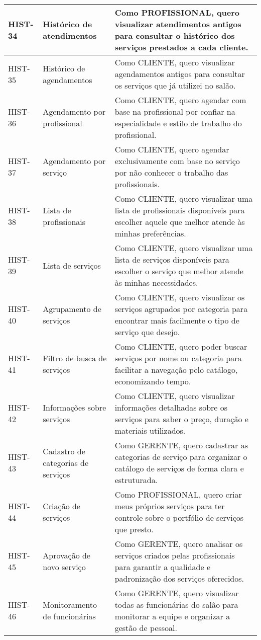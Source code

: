 \begin{longtable}{|p{2cm}|p{4cm}|p{9cm}|}
	HIST-34 & Histórico de atendimentos & Como PROFISSIONAL, quero visualizar atendimentos antigos para consultar o histórico dos serviços prestados a cada cliente. \\ \hline
	HIST-35 & Histórico de agendamentos & Como CLIENTE, quero visualizar agendamentos antigos para consultar os serviços que já utilizei no salão. \\ \hline
	HIST-36 & Agendamento por profissional & Como CLIENTE, quero agendar com base na profissional por confiar na especialidade e estilo de trabalho do profissional. \\ \hline
	HIST-37 & Agendamento por serviço & Como CLIENTE, quero agendar exclusivamente com base no serviço por não conhecer o trabalho das profissionais. \\ \hline
	HIST-38 & Lista de profissionais & Como CLIENTE, quero visualizar uma lista de profissionais disponíveis para escolher aquele que melhor atende às minhas preferências. \\ \hline
	HIST-39 & Lista de serviços & Como CLIENTE, quero visualizar uma lista de serviços disponíveis para escolher o serviço que melhor atende às minhas necessidades. \\ \hline
	HIST-40 & Agrupamento de serviços & Como CLIENTE, quero visualizar os serviços agrupados por categoria para encontrar mais facilmente o tipo de serviço que desejo. \\ \hline
	HIST-41 & Filtro de busca de serviços & Como CLIENTE, quero poder buscar serviços por nome ou categoria para facilitar a navegação pelo catálogo, economizando tempo. \\ \hline
	HIST-42 & Informações sobre serviços & Como CLIENTE, quero visualizar informações detalhadas sobre os serviços para saber o preço, duração e materiais utilizados. \\ \hline
	HIST-43 & Cadastro de categorias de serviços & Como GERENTE, quero cadastrar as categorias de serviço para organizar o catálogo de serviços de forma clara e estruturada. \\ \hline
	HIST-44 & Criação de serviços & Como PROFISSIONAL, quero criar meus próprios serviços para ter controle sobre o portfólio de serviços que presto. \\ \hline
	HIST-45 & Aprovação de novo serviço & Como GERENTE, quero analisar os serviços criados pelas profissionais para garantir a qualidade e padronização dos serviços oferecidos. \\ \hline
	HIST-46 & Monitoramento de funcionárias & Como GERENTE, quero visualizar todas as funcionárias do salão para monitorar a equipe e organizar a gestão de pessoal. \\ \hline

\end{longtable}
